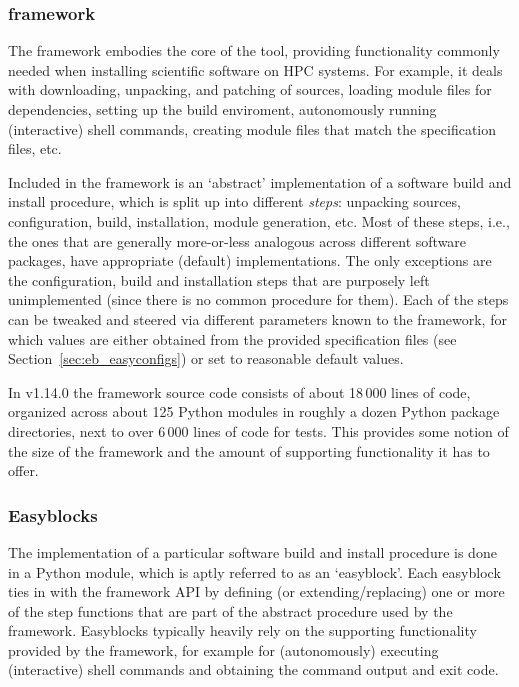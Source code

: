 \subsubsection{\easybuild{} framework}
\label{sec:eb_framework}

The \easybuild{} framework embodies the core of the tool,
providing functionality commonly needed when installing scientific software on HPC
systems. For example, it deals with downloading, unpacking, and patching of sources,
loading module files for dependencies, setting up the build enviroment, autonomously
running (interactive) shell commands, creating module files that match the
specification files, etc.

Included in the framework is an `abstract' implementation of a software build and
install procedure, which is split up into different \emph{steps}: unpacking sources,
configuration, build, installation, module generation, etc. Most of these steps,
i.e., the ones that are generally more-or-less analogous across
different software packages, have appropriate (default) implementations. The only
exceptions are the configuration, build and installation steps that are purposely
left unimplemented (since there is no common procedure for them). Each of the steps
can be tweaked and steered via different parameters known to the framework, for
which values are either obtained from the provided specification files (see
Section~\ref{sec:eb_easyconfigs}) or set to reasonable default values.

In \easybuild{} v1.14.0 the framework source code consists of about 18\,000 lines
of code, organized across about 125 Python modules in roughly a dozen Python
package directories, next to over 6\,000 lines of code for tests. This provides some
notion of the size of the \easybuild{} framework and the amount of supporting
functionality it has to offer.

\subsubsection{Easyblocks}
\label{sec:eb_easyblocks}

The implementation of a particular software build and install procedure is done in
a Python module, which is aptly referred to as an `easyblock'. Each easyblock
ties in with the framework API by defining (or extending/replacing) one or more of
the step functions that are part of the abstract procedure used by the
\easybuild{} framework. Easyblocks typically heavily rely on the supporting
functionality provided by the framework, for example for (autonomously)
executing (interactive) shell commands and obtaining the command output and
exit code.

